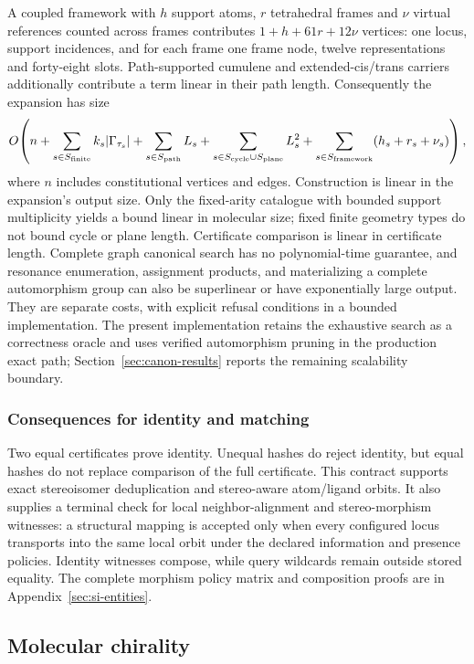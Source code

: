 \documentclass[pdflatex,sn-mathphys-num,referee,lineno]{sn-jnl}
\theoremstyle{plain}
\theoremstyle{remark}
\theoremstyle{definition}
\begin{document}
A coupled framework with \(h\) support atoms, \(r\) tetrahedral frames and
\(\nu\) virtual references counted across frames contributes
\(1+h+61r+12\nu\) vertices: one locus, support incidences, and for each frame
one frame node, twelve representations and forty-eight slots. Path-supported
cumulene and extended-cis/trans carriers additionally contribute a term linear
in their path length. Consequently the expansion has size
\[
 O\!\left(n+
 \sum_{s\in S_{\rm finite}} k_s|\Gamma_{\tau_s}|+
 \sum_{s\in S_{\rm path}}L_s+
 \sum_{s\in S_{\rm cycle}\cup S_{\rm plane}}L_s^2+
 \sum_{s\in S_{\rm framework}}(h_s+r_s+\nu_s)\right),
\]
where \(n\) includes constitutional vertices and edges. Construction is
linear in the expansion's output size. Only the fixed-arity catalogue with
bounded support multiplicity yields a bound linear in molecular size; fixed
finite geometry types do not bound cycle or plane length. Certificate
comparison is linear in certificate length. Complete graph canonical search
has no polynomial-time guarantee, and resonance enumeration, assignment
products, and materializing a complete automorphism group can also be
superlinear or have exponentially large output. They are separate costs,
with explicit refusal conditions in a bounded implementation.
The present implementation retains the exhaustive search as a correctness
oracle and uses verified automorphism pruning in the production exact path;
Section~\ref{sec:canon-results} reports the remaining scalability boundary.

\subsubsection{Consequences for identity and matching}

Two equal certificates prove identity.  Unequal hashes do reject identity, but
equal hashes do not replace comparison of the full certificate.  This contract
supports exact stereoisomer deduplication and stereo-aware atom/ligand orbits.
It also supplies a terminal check for local neighbor-alignment and
stereo-morphism witnesses: a structural mapping is accepted only when every
configured locus transports into the same local orbit under the declared
information and presence policies.  Identity witnesses compose, while query
wildcards remain outside stored equality.  The complete morphism policy matrix
and composition proofs are in Appendix~\ref{sec:si-entities}.

\subsection{Molecular chirality}
\label{sec:chirality}
\end{document}

